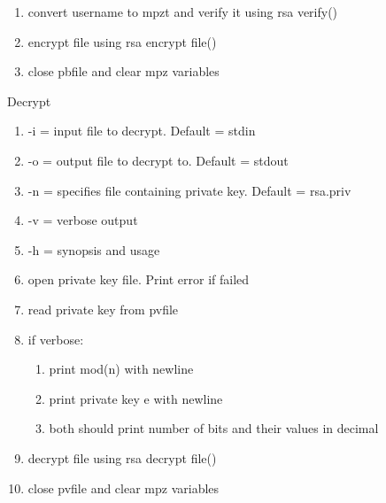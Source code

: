 \documentclass[11pt]{article}
\begin{document}
\begin{enumerate}
\item convert username to mpzt and verify it using rsa verify() 
\item encrypt file using rsa encrypt file()
\item close pbfile and clear mpz variables
\end{enumerate}
Decrypt
\begin{enumerate}
\item -i = input file to decrypt. Default = stdin
\item -o = output file to decrypt to. Default = stdout
\item -n = specifies file containing private key. Default = rsa.priv
\item -v = verbose output
\item -h = synopsis  and usage
\item open private key file. Print error if failed
\item read private key from pvfile
\item if verbose:
	\begin{enumerate}
	\item print mod(n) with newline
	\item print private key e with newline
	\item both should print number of bits and their values in decimal
	\end{enumerate}
\item decrypt file using rsa decrypt file()
\item close pvfile and clear mpz variables
\end{enumerate}
\end{document}
